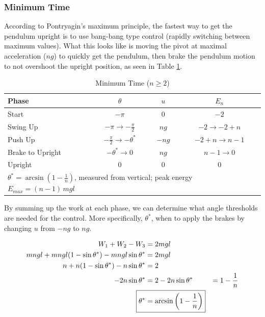 \documentclass{article}
\begin{document}
\subsubsection{Minimum Time}
According to Pontryagin's maximum principle, the fastest way to get the pendulum upright is to use bang-bang type control (rapidly switching between maximum values). What this looks like is moving the pivot at maximal acceleration ($ng$) to quickly get the pendulum, then brake the pendulum motion to not overshoot the upright position, as seen in Table \ref{tab:mt}.

\begin{table}[ht]
  \centering
  \caption{Minimum Time ($n \geq 2$)}
  \label{tab:mt}
  \begin{tabular}{|l|c|c|c|}
    \hline
    Phase & $\theta$ & $u$ & $E_n$ \\
    \hline
    Start & $-\pi$ & $0$ & $-2$ \\
    Swing Up & $-\pi \rightarrow -\frac{\pi}{2}$ & $ng$ & $-2 \rightarrow -2 + n$ \\
    Push Up & $-\frac{\pi}{2} \rightarrow -\theta^*$ & $-ng$ & $-2 + n \rightarrow n - 1$ \\
    Brake to Upright & $-\theta^* \rightarrow 0$ & $ng$ & $n - 1 \rightarrow 0$ \\
    Upright & $0$ & $0$ & $0$ \\
    \hline
    \multicolumn{4}{|l|}{$\theta^* = \arcsin\!\left(1 - \frac{1}{n}\right)$, measured from vertical; peak energy $E_{max} = (n-1)\,mgl$} \\
    \hline
  \end{tabular}
\end{table}

By summing up the work at each phase, we can determine what angle thresholds are needed for the control. More specifically, $\theta^*$, when to apply the brakes by changing $u$ from $-ng$ to $ng$.

\begin{align*}
    W_1 + W_2 - W_3 &= 2mgl \\
    mngl + mngl(1-\sin{\theta^*}) - mngl\sin{\theta^*} &= 2mgl \\
    n + n(1-\sin{\theta^*}) - n\sin{\theta^*} &= 2 \\
    -2n\sin{\theta^*} &= 2-2n
    \sin{\theta^*} &= 1 - \frac{1}{n} \\
    \Aboxed{\theta^* &= \arcsin{\left(1-\frac{1}{n}\right)}}
\end{align*}
\end{document}
